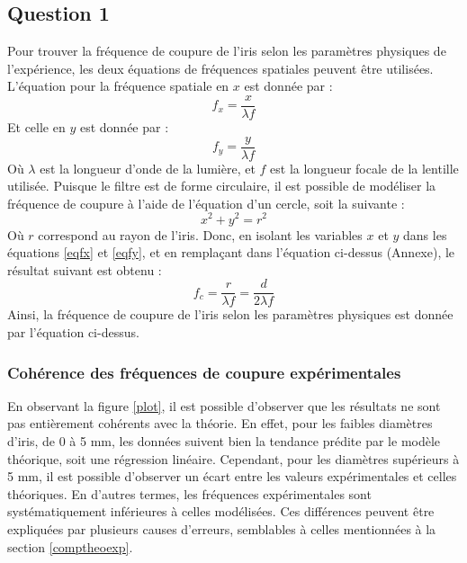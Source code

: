\documentclass[11pt,letterpaper]{article}
\begin{document}
\subsection{Question 1}\label{q1}

Pour trouver la fréquence de coupure de l'iris selon les paramètres physiques de l'expérience, les deux équations de fréquences spatiales peuvent être utilisées. L'équation pour la fréquence spatiale en $x$ est donnée par :
\begin{equation}
  f_{x}=\frac{x}{\lambda f}
  \label{eqfx}
\end{equation}
Et celle en $y$ est donnée par :
\begin{equation}
  f_{y}=\frac{y}{\lambda f}
  \label{eqfy}
\end{equation}
Où $\lambda$ est la longueur d'onde de la lumière, et $f$ est la longueur focale de la lentille utilisée. Puisque le filtre est de forme circulaire, il est possible de modéliser la fréquence de coupure à l'aide de l'équation d'un cercle, soit la suivante :
\begin{equation}
  x^{2}+y^{2}=r^{2}
  \label{eqcercle}
\end{equation}
Où $r$ correspond au rayon de l'iris. Donc, en isolant les variables $x$ et $y$ dans les équations \ref{eqfx} et \ref{eqfy}, et en remplaçant dans l'équation ci-dessus (Annexe), le résultat suivant est obtenu :
\begin{equation}
  f_{c}=\frac{r}{\lambda f}=\frac{d}{2\lambda f}
  \label{eqfc}
\end{equation}
Ainsi, la fréquence de coupure de l'iris selon les paramètres physiques est donnée par l'équation ci-dessus.

\subsubsection{Cohérence des fréquences de coupure expérimentales}
En observant la figure \ref{plot}, il est possible d'observer que les résultats ne sont pas entièrement cohérents avec la théorie. En effet, pour les faibles diamètres d'iris, de 0 à 5 mm, les données suivent bien la tendance prédite par le modèle théorique, soit une régression linéaire. Cependant, pour les diamètres supérieurs à 5 mm, il est possible d'observer un écart entre les valeurs expérimentales et celles théoriques. En d'autres termes, les fréquences expérimentales sont systématiquement inférieures à celles modélisées. Ces différences peuvent être expliquées par plusieurs causes d'erreurs, semblables à celles mentionnées à la section \ref{comptheoexp}.
\end{document}
